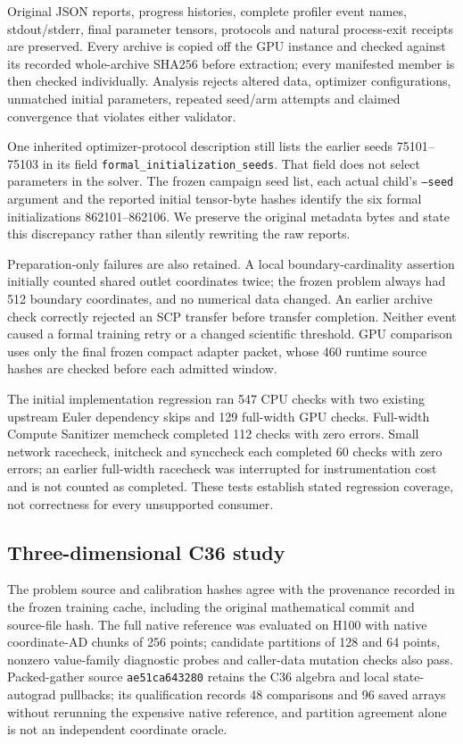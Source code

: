 \documentclass[11pt]{article}
\begin{document}
Original JSON reports, progress histories, complete profiler event names,
stdout/stderr, final parameter tensors, protocols and natural process-exit
receipts are preserved. Every archive is copied off the GPU instance and
checked against its recorded whole-archive SHA256 before extraction; every
manifested member is then checked individually. Analysis rejects altered
data, optimizer configurations, unmatched initial parameters, repeated
seed/arm attempts and claimed convergence that violates either validator.

One inherited optimizer-protocol description still lists the earlier
seeds 75101--75103 in its field \texttt{formal\_initialization\_seeds}. That field does not
select parameters in the solver. The frozen campaign seed list, each actual
child's \texttt{--seed} argument and the reported initial tensor-byte hashes
identify the six formal initializations 862101--862106. We preserve the
original metadata bytes and state this discrepancy rather than silently
rewriting the raw reports.

Preparation-only failures are also retained. A local boundary-cardinality
assertion initially counted shared outlet coordinates twice; the frozen
problem always had 512 boundary coordinates, and no numerical data changed.
An earlier archive check correctly rejected an SCP transfer before transfer
completion. Neither event caused a formal training retry or a changed
scientific threshold. GPU comparison uses only the final frozen compact
adapter packet, whose 460 runtime source hashes are checked before each
admitted window.

The initial implementation regression ran 547 CPU checks with two existing
upstream Euler dependency skips and 129 full-width GPU checks. Full-width
Compute Sanitizer memcheck completed 112 checks with zero errors. Small
network racecheck, initcheck and synccheck each completed 60 checks with
zero errors; an earlier full-width racecheck was interrupted for
instrumentation cost and is not counted as completed. These tests establish
stated regression coverage, not correctness for every unsupported consumer.

\subsection{Three-dimensional C36 study}
The problem source and calibration hashes agree with the provenance
recorded in the frozen training cache, including the original mathematical
commit and source-file hash. The full native reference was evaluated on
H100 with native coordinate-AD chunks of 256 points; candidate partitions of
128 and 64 points, nonzero value-family diagnostic probes and caller-data
mutation checks also pass. Packed-gather source \texttt{ae51ca643280}
retains the C36 algebra and local state-autograd pullbacks; its
qualification records 48 comparisons and 96 saved arrays without rerunning
the expensive native reference, and partition agreement alone is not an
independent coordinate oracle.
\end{document}
